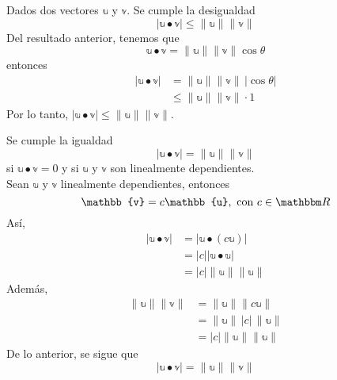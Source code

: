 \begin{theorem}\label{theo:Cauchy-Schwarz}
    Dados dos vectores $\mathbb{u}$ y $\mathbb{v}$. Se cumple la desigualdad
    $$|\mathbb{u} \bullet \mathbb{v}| \leq \| \mathbb{u} \| \| \mathbb{v} \|$$
    \demostracion Del resultado anterior, tenemos que
    $$\mathbb{u} \bullet \mathbb{v} = \| \mathbb{u} \| \| \mathbb{v} \| \cos \theta$$
    entonces
    \begin{align*}
        |\mathbb{u} \bullet \mathbb{v}| & = \| \mathbb{u} \| \| \mathbb{v} \| \, |\cos \theta| \\
        & \leq \| \mathbb{u} \| \| \mathbb{v} \| \cdot 1
    \end{align*}
    Por lo tanto, $|\mathbb{u} \bullet \mathbb{v}| \leq \| \mathbb{u} \| \| \mathbb{v} \|$.
\end{theorem}

\begin{observation}
    Se cumple la igualdad
    $$|\mathbb{u} \bullet \mathbb{v}| = \| \mathbb{u} \| \| \mathbb{v} \|$$
    si $\mathbb{u} \bullet \mathbb{v} = 0$ y si $\mathbb{u}$ y $\mathbb{v}$ son linealmente dependientes. \\
    \demostracion Sean $\mathbb{u}$ y $\mathbb{v}$ linealmente dependientes, entonces
    $$\mathbb{v} = c \mathbb{u}, \text{ con } c \in \RR$$
    Así,
    \begin{align*}
        |\mathbb{u} \bullet \mathbb{v}| & = |\mathbb{u} \bullet (c \mathbb{u})| \\
        & = |c| |\mathbb{u} \bullet \mathbb{u}| \\
        & = |c| \| \mathbb{u} \| \| \mathbb{u} \|
    \end{align*}
    Además,
    \begin{align*}
        \| \mathbb{u} \| \| \mathbb{v} \| & = \| \mathbb{u} \| \| c \mathbb{u} \| \\
        & = \| \mathbb{u} \| \, |c| \, \| \mathbb{u} \| \\
        & = |c| \| \mathbb{u} \| \| \mathbb{u} \|
    \end{align*}
    De lo anterior, se sigue que
    $$|\mathbb{u} \bullet \mathbb{v}| = \| \mathbb{u} \| \| \mathbb{v} \|$$
\end{observation}

